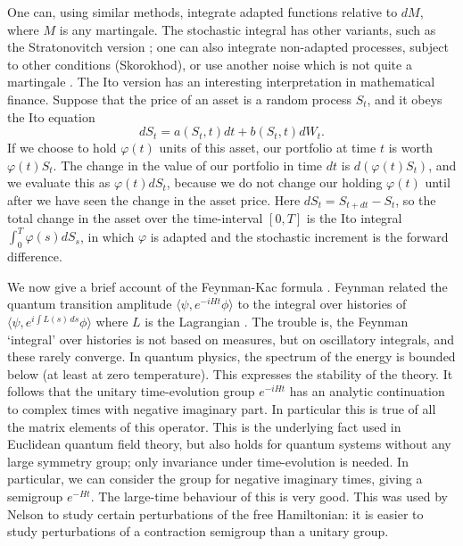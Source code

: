 One can, using similar methods, integrate adapted functions relative to
$dM$, where $M$ is any martingale. The stochastic integral has other
variants, such as the Stratonovitch
version \cite{Wiener2,Nelson4}; one can also integrate non-adapted
processes, subject to
other conditions (Skorokhod), or use another noise which is not quite
a martingale \cite{McShane,Barnett3}.
The Ito version has an interesting interpretation in mathematical finance.
Suppose that the price of an asset is a random process $S_t$, and it
obeys the Ito equation
\[dS_t=a(S_t,t)dt+b(S_t,t)dW_t.\]
If we choose to hold $\varphi(t)$ units of this asset, our portfolio at time
$t$ is worth $\varphi(t)S_t$. The change in the value of our portfolio
in time $dt$ is $d(\varphi(t)S_t)$, and we evaluate this as $\varphi(t)dS_t$,
because we do not change our holding $\varphi(t)$ until after we have seen
the change in the asset price. Here $dS_t=S_{t+dt}-S_t$, so the total
change in the asset over the time-interval $[0,T]$ is the Ito integral
$\int_0^T\varphi(s)dS_s$, in which $\varphi$ is adapted and the stochastic
increment is the forward difference.

We now give a brief account of the Feynman-Kac formula \cite{Kac}.
Feynman related the quantum transition amplitude $\langle\psi,e^{-iHt}\phi
\rangle$ to the integral over histories of $\langle\psi,e^{i\int L(s)\,ds}\phi
\rangle$ where $L$ is the Lagrangian \cite{Feynman}. The trouble is,
the Feynman `integral' over histories is not based on measures, but on
oscillatory integrals, and these rarely converge. In quantum
physics, the spectrum of the energy is bounded below (at least
at zero temperature). This expresses the
stability of the theory. It follows that the unitary time-evolution group
$e^{-iHt}$ has an analytic continuation to complex times with negative
imaginary part. In particular this is true of all the matrix elements
of this operator. This is the underlying fact used in Euclidean
quantum field theory, but also holds for quantum systems without any large
symmetry group; only invariance under time-evolution is needed. In
particular, we can consider the group for negative imaginary times,
giving a semigroup $e^{-Ht}$. The
large-time behaviour of this is very good. This was used by Nelson
\cite{Nelson} to study certain perturbations of the free Hamiltonian: it is
easier to study perturbations of a contraction
semigroup than a unitary group.


